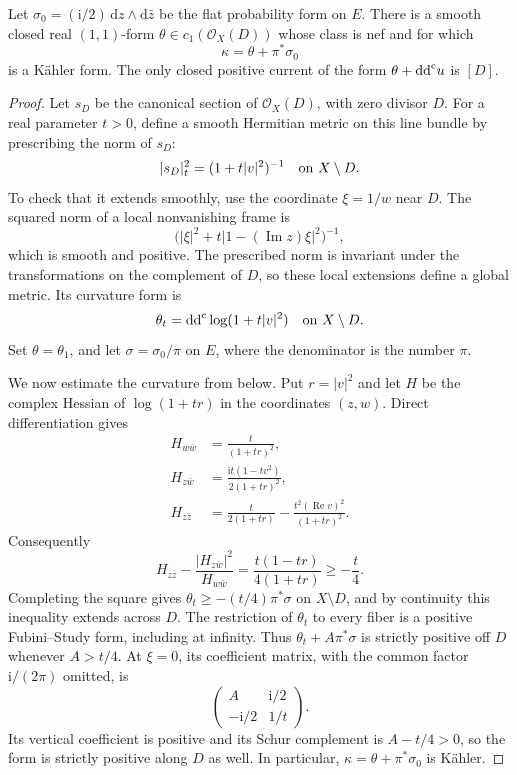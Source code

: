 \begin{lemma}\label{lem:ruled-explicit-nef}
Let $\sigma_0=(\mathrm i/2)\,\mathrm{d}z\wedge\mathrm{d}\bar z$ be the flat probability form on $E$. There is a smooth closed real $(1,1)$-form $\theta\in c_1(\mathcal O_X(D))$ whose class is nef and for which
\[
 \kappa=\theta+\pi^*\sigma_0
\]
is a K\"ahler form. The only closed positive current of the form $\theta+\mathrm{dd}^{\mathrm{c}} u$ is $[D]$.
\end{lemma}
\begin{proof}
Let $s_D$ be the canonical section of $\mathcal O_X(D)$, with zero divisor $D$. For a real parameter $t>0$, define a smooth Hermitian metric on this line bundle by prescribing the norm of $s_D$:
\[
 |s_D|_t^2=(1+t|v|^2)^{-1}\quad\hbox{on }X\setminus D.
\]
To check that it extends smoothly, use the coordinate $\xi=1/w$ near $D$. The squared norm of a local nonvanishing frame is
\[
 \bigl(|\xi|^2+t|1-(\operatorname{Im}z)\xi|^2\bigr)^{-1},
\]
which is smooth and positive. The prescribed norm is invariant under the transformations on the complement of $D$, so these local extensions define a global metric. Its curvature form is
\[
 \theta_t=\mathrm{dd}^{\mathrm{c}}\log(1+t|v|^2)
 \quad\hbox{on }X\setminus D.
\]
Set $\theta=\theta_1$, and let $\sigma=\sigma_0/\pi$ on $E$, where the denominator is the number $\pi$.

We now estimate the curvature from below. Put $r=|v|^2$ and let $H$ be the complex Hessian of $\log(1+tr)$ in the coordinates $(z,w)$. Direct differentiation gives
\[
 \begin{split}
 H_{w\bar w}&=\frac{t}{(1+tr)^2},\\
 H_{z\bar w}&=\frac{\mathrm i t(1-tv^2)}{2(1+tr)^2},\\
 H_{z\bar z}&=\frac{t}{2(1+tr)}
             -\frac{t^2(\operatorname{Re}v)^2}{(1+tr)^2}.
 \end{split}
\]
Consequently
\[
 H_{z\bar z}-\frac{|H_{z\bar w}|^2}{H_{w\bar w}}
 =\frac{t(1-tr)}{4(1+tr)}\geq-\frac t4.
\]
Completing the square gives $\theta_t\geq-(t/4)\pi^*\sigma$ on $X\setminus D$, and by continuity this inequality extends across $D$. The restriction of $\theta_t$ to every fiber is a positive Fubini--Study form, including at infinity. Thus $\theta_t+A\pi^*\sigma$ is strictly positive off $D$ whenever $A>t/4$. At $\xi=0$, its coefficient matrix, with the common factor $\mathrm i/(2\pi)$ omitted, is
\[
 \begin{pmatrix} A&\mathrm i/2\\-\mathrm i/2&1/t\end{pmatrix}.
\]
Its vertical coefficient is positive and its Schur complement is $A-t/4>0$, so the form is strictly positive along $D$ as well. In particular, $\kappa=\theta+\pi^*\sigma_0$ is K\"ahler.


\end{proof}
